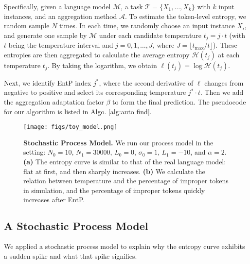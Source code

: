 Specifically, given a language model $\mathcal{M}$, a task $\mathcal{T}=\{X_1,\ldots,X_k\}$ with $k$ input instances, and an aggregation method $\mathcal{A}$.
To estimate the token-level entropy, we random sample $N$ times. In each time, we randomly choose an input instance $X_i$, and generate one sample by $\mathcal{M}$ under each candidate temperature $t_j = j \cdot t$ (with $t$ being the temperature interval and $j = 0,1,\ldots, J$, where $J=\lfloor t_{\max}/t\rfloor$). These entropies are then aggregated to calculate the average entropy $\mathcal{H}(t_j)$ at each temperature $t_j$. By taking the logarithm, we obtain $\ell(t_j) = \log \mathcal{H}(t_j)$.

Next, we identify EntP index $j^*$, where the second derivative of $\ell$ changes from negative to positive and select its corresponding temperature $j^*\cdot t$. Then we add the aggregation adaptation factor $\beta$ to form the final prediction.
The pseudocode for our algorithm is listed in Algo. \ref{alg:auto find}.

\begin{figure}[ht]
\texttt{[image: figs/toy\_model.png]}
\vspace{-5mm}
\caption{\textbf{Stochastic Process Model.} We run our process model in the setting: $N_0=10$, $N_1=30000$, $L_0=0$, $\sigma_0=1$, $L_1=-10$, and $\alpha=2$. \textbf{(a)} The entropy curve is similar to that of the real language model: flat at first, and then sharply increases. \textbf{(b)} We calculate the relation between temperature and the percentage of improper tokens in simulation, and the percentage of improper tokens quickly increases after EntP.}
\vspace{-5mm}
\label{fig: toy_model}
\end{figure}

\subsection{A Stochastic Process Model}
\label{sec: toy model}
We applied a stochastic process model to explain why the entropy curve exhibits a sudden spike and what that spike signifies.

